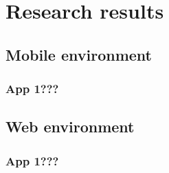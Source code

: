 
\chapter{Research results}

\section{Mobile environment}

\subsection{App 1???}

\section{Web environment}

\subsection{App 1???}

